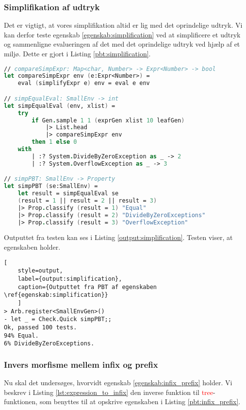\subsubsection{Simplifikation af udtryk}\label{sec:PBT_simplification}
Det er vigtigt, at vores simplifikation altid er lig med det oprindelige udtryk. Vi kan derfor teste egenskab \ref{egenskab:simplification} ved at simplificere et udtryk og sammenligne evalueringen af det med det oprindelige udtryk ved hjælp af et miljø. Dette er gjort i Listing \ref{pbt:simplification}.

\begin{lstlisting}[language={FSharp}, caption={PBT af egenskaben \ref{egenskab:simplification}}, label={pbt:simplification}]
// compareSimpExpr: Map<char, Number> -> Expr<Number> -> bool
let compareSimpExpr env (e:Expr<Number>) =
    eval (simplifyExpr e) env = eval e env

// simpEqualEval: SmallEnv -> int
let simpEqualEval (env, xlist) = 
    try
        if Gen.sample 1 1 (exprGen xlist 10 leafGen) 
            |> List.head 
            |> compareSimpExpr env 
        then 1 else 0
    with
        | :? System.DivideByZeroException as _ -> 2
        | :? System.OverflowException as _ -> 3

// simpPBT: SmallEnv -> Property
let simpPBT (se:SmallEnv) =
    let result = simpEqualEval se
    (result = 1 || result = 2 || result = 3)
    |> Prop.classify (result = 1) "Equal"
    |> Prop.classify (result = 2) "DivideByZeroExceptions"
    |> Prop.classify (result = 3) "OverflowException"   
\end{lstlisting}

Outputtet fra testen kan ses i Listing \ref{output:simplification}. Testen viser, at egenskaben holder.

\begin{lstlisting}[
    style=output, 
    label={output:simplification}, 
    caption={Outputtet fra PBT af egenskaben \ref{egenskab:simplification}}
    ]
> Arb.register<SmallEnvGen>()
- let _ = Check.Quick simpPBT;;
Ok, passed 100 tests.
94% Equal.
6% DivideByZeroExceptions.
\end{lstlisting}

\subsubsection{Invers morfisme mellem infix og prefix}\label{sec:PBT_infix_prefix}
Nu skal det undersøges, hvorvidt egenskab \ref{egenskab:infix_prefix} holder. Vi beskrev i Listing \ref{lst:expression_to_infix} den inverse funktion til \textcolor{red}{tree}-funktionen, som benyttes til at opskrive egenskaben i Listing \ref{pbt:infix_prefix}.

